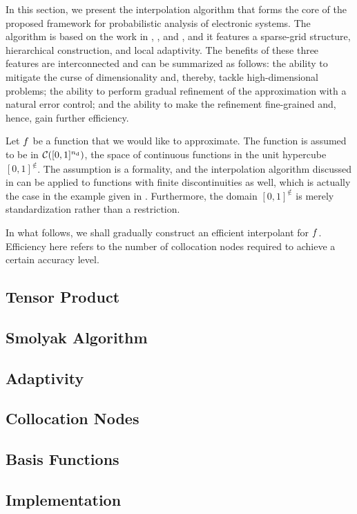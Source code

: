 In this section, we present the interpolation algorithm that forms the core of
the proposed framework for probabilistic analysis of electronic systems. The
algorithm is based on the work in \cite{klimke2006}, \cite{ma2009}, and
\cite{jakeman2012}, and it features a sparse-grid structure, hierarchical
construction, and local adaptivity. The benefits of these three features are
interconnected and can be summarized as follows: the ability to mitigate the
curse of dimensionality and, thereby, tackle high-dimensional problems; the
ability to perform gradual refinement of the approximation with a natural error
control; and the ability to make the refinement fine-grained and, hence, gain
further efficiency.

Let $f$ be a function that we would like to approximate. The function is
assumed to be in $\mathcal{C}([0, 1]^{n_\text{d}})$, the space of continuous functions
in the unit hypercube $[0, 1]^\nin$. The assumption is a formality, and the
interpolation algorithm discussed in  can be applied to
functions with finite discontinuities as well, which is actually the case in the
example given in . Furthermore, the domain $[0, 1]^\nin$ is
merely standardization rather than a restriction.

In what follows, we shall gradually construct an efficient interpolant for $f$.
Efficiency here refers to the number of collocation nodes required to achieve a
certain accuracy level.

\subsection{Tensor Product} 


\subsection{Smolyak Algorithm} 


\subsection{Adaptivity} 


\subsection{Collocation Nodes} 


\subsection{Basis Functions} 


\subsection{Implementation} 

